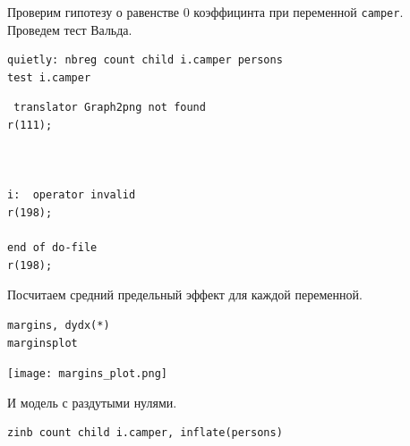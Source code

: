 \documentclass[]{book}
\begin{document}
Проверим гипотезу о равенстве 0 коэффицинта при переменной \texttt{camper}. Проведем тест Вальда.

\begin{verbatim}
quietly: nbreg count child i.camper persons 
test i.camper 
\end{verbatim}

\begin{verbatim}
 translator Graph2png not found
r(111);



i:  operator invalid
r(198);

end of do-file
r(198);
\end{verbatim}

Посчитаем средний предельный эффект для каждой переменной.

\begin{verbatim}
margins, dydx(*)
marginsplot
\end{verbatim}

\texttt{[image: margins\_plot.png]}

И модель с раздутыми нулями.

\begin{verbatim}
zinb count child i.camper, inflate(persons)
\end{verbatim}
\end{document}

